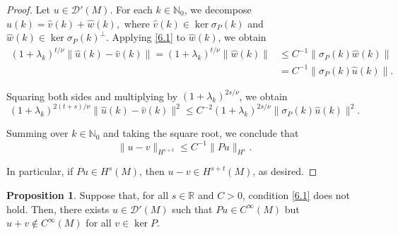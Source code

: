 \documentclass{amsart}
\theoremstyle{definition}
\newtheorem{proposition}[theorem]{Proposition}
\theoremstyle{remark}
\numberwithin{equation}{section}
\begin{document}
	\begin{proof}
		Let $u\in\mathscr{D}'(M)$. For each $k\in\mathbb{N}_0$, we decompose
		$\widehat{u}(k) = \widehat{v}(k) + \widehat{w}(k),$ where $\widehat{v}(k) \in \ker \sigma_P(k)$ and $\widehat{w}(k) \in \ker \sigma_P(k)^\perp$. 		
		Applying \eqref{6.1} to $\widehat{w}(k)$, we obtain
		\begin{align*}
			(1+\lambda_k)^{t/\nu} \|\widehat{u}(k) - \widehat{v}(k)\| 
			= (1+\lambda_k)^{t/\nu} \|\widehat{w}(k)\| 
			& \leq C^{-1} \|\sigma_P(k) \widehat{w}(k)\| \\
			&= C^{-1} \|\sigma_P(k) \widehat{u}(k)\|.
		\end{align*}
		
		Squaring both sides and multiplying by $(1+\lambda_k)^{2s/\nu}$, we obtain
		\begin{equation*}
			(1+\lambda_k)^{2(t+s)/\nu} \|\widehat{u}(k) - \widehat{v}(k)\|^2 
			\leq C^{-2} (1+\lambda_k)^{2s/\nu} \|\sigma_P(k) \widehat{u}(k)\|^2.
		\end{equation*}
		
		Summing over $k\in\mathbb{N}_0$ and taking the square root, we conclude that
		\begin{equation*}
			\|u-v\|_{H^{s+t}} \leq C^{-1} \|Pu\|_{H^s}.
		\end{equation*}
		
		In particular, if $Pu\in H^s(M)$, then $u-v\in H^{s+t}(M)$, as desired.
	\end{proof}
		
	\begin{proposition}\label{agh_1}
		Suppose that, for all $s\in\mathbb{R}$ and $C>0$, condition \eqref{6.1} does not hold. Then, there exists $u\in\mathscr{D}'(M)$ such that $Pu\in C^\infty(M)$ but $u+v\notin C^\infty(M)$ for all $v\in\ker P$.
	\end{proposition}
	
\end{document}
